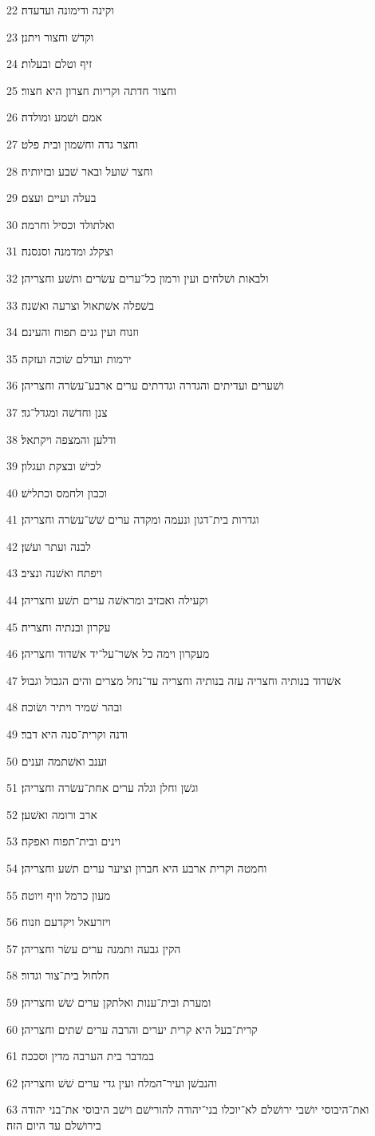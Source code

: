 \par 22 וקינה ודימונה ועדעדה׃
\par 23 וקדשׁ וחצור ויתנן׃
\par 24 זיף וטלם ובעלות׃
\par 25 וחצור חדתה וקריות חצרון היא חצור׃
\par 26 אמם ושׁמע ומולדה׃
\par 27 וחצר גדה וחשׁמון ובית פלט׃
\par 28 וחצר שׁועל ובאר שׁבע ובזיותיה׃
\par 29 בעלה ועיים ועצם׃
\par 30 ואלתולד וכסיל וחרמה׃
\par 31 וצקלג ומדמנה וסנסנה׃
\par 32 ולבאות ושׁלחים ועין ורמון כל־ערים עשׂרים ותשׁע וחצריהן׃
\par 33 בשׁפלה אשׁתאול וצרעה ואשׁנה׃
\par 34 וזנוח ועין גנים תפוח והעינם׃
\par 35 ירמות ועדלם שׂוכה ועזקה׃
\par 36 ושׁערים ועדיתים והגדרה וגדרתים ערים ארבע־עשׂרה וחצריהן׃
\par 37 צנן וחדשׁה ומגדל־גד׃
\par 38 ודלען והמצפה ויקתאל׃
\par 39 לכישׁ ובצקת ועגלון׃
\par 40 וכבון ולחמס וכתלישׁ׃
\par 41 וגדרות בית־דגון ונעמה ומקדה ערים שׁשׁ־עשׂרה וחצריהן׃
\par 42 לבנה ועתר ועשׁן׃
\par 43 ויפתח ואשׁנה ונציב׃
\par 44 וקעילה ואכזיב ומראשׁה ערים תשׁע וחצריהן׃
\par 45 עקרון ובנתיה וחצריה׃
\par 46 מעקרון וימה כל אשׁר־על־יד אשׁדוד וחצריהן׃
\par 47 אשׁדוד בנותיה וחצריה עזה בנותיה וחצריה עד־נחל מצרים והים הגבול וגבול׃
\par 48 ובהר שׁמיר ויתיר ושׂוכה׃
\par 49 ודנה וקרית־סנה היא דבר׃
\par 50 וענב ואשׁתמה וענים׃
\par 51 וגשׁן וחלן וגלה ערים אחת־עשׂרה וחצריהן׃
\par 52 ארב ורומה ואשׁען׃
\par 53 וינים ובית־תפוח ואפקה׃
\par 54 וחמטה וקרית ארבע היא חברון וציער ערים תשׁע וחצריהן׃
\par 55 מעון כרמל וזיף ויוטה׃
\par 56 ויזרעאל ויקדעם וזנוח׃
\par 57 הקין גבעה ותמנה ערים עשׂר וחצריהן׃
\par 58 חלחול בית־צור וגדור׃
\par 59 ומערת ובית־ענות ואלתקן ערים שׁשׁ וחצריהן׃
\par 60 קרית־בעל היא קרית יערים והרבה ערים שׁתים וחצריהן׃
\par 61 במדבר בית הערבה מדין וסככה׃
\par 62 והנבשׁן ועיר־המלח ועין גדי ערים שׁשׁ וחצריהן׃
\par 63 ואת־היבוסי יושׁבי ירושׁלם לא־יוכלו בני־יהודה להורישׁם וישׁב היבוסי את־בני יהודה בירושׁלם עד היום הזה׃

